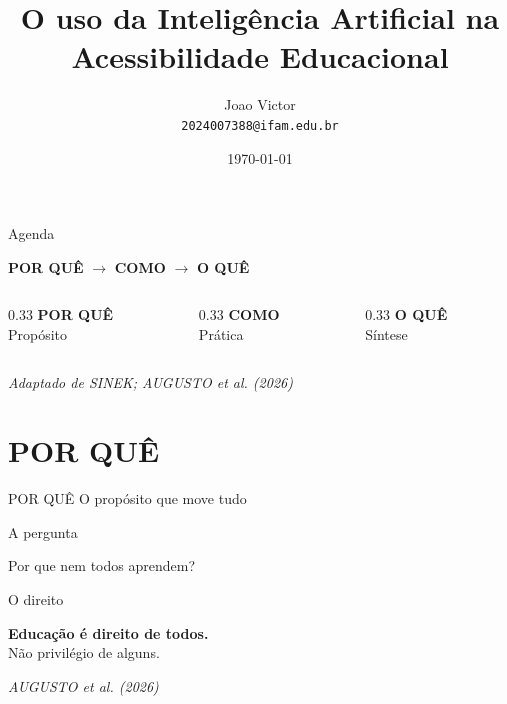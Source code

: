 \documentclass[11pt]{beamer}
\author[Joao Victor]{%
	Joao Victor\\[0.3em]
	\small\texttt{2024007388@ifam.edu.br}}
\title[IA na Acessibilidade Educacional]{O uso da Inteligência Artificial na Acessibilidade Educacional}
\institute[]{%
	Graduando em Licenciatura em Matemática\\}
\date{\today}
\newcommand{\citabnt}[1]{%
	\vfill
	\begin{flushright}
		\tiny\textit{#1}
	\end{flushright}
}
\begin{document}
	
	\begin{frame}
		\titlepage
	\end{frame}
	
	\begin{frame}{Agenda}
		\begin{center}
			\Large
			\textbf{POR QUÊ} $\rightarrow$ \textbf{COMO} $\rightarrow$ \textbf{O QUÊ}
		\end{center}
		\vspace{1.5em}
		\begin{columns}[T]
			\begin{column}{0.33\textwidth}
				\centering
				\textbf{\large POR QUÊ}\\[0.3em]
				\tiny Propósito
			\end{column}
			\begin{column}{0.33\textwidth}
				\centering
				\textbf{\large COMO}\\[0.3em]
				\tiny Prática
			\end{column}
			\begin{column}{0.33\textwidth}
				\centering
				\textbf{\large O QUÊ}\\[0.3em]
				\tiny Síntese
			\end{column}
		\end{columns}
		\citabnt{Adaptado de SINEK; AUGUSTO et al. (2026)}
	\end{frame}
	
	\section{POR QUÊ}
	
	\begin{frame}{}
		\begin{center}
			\Huge POR QUÊ
			\vspace{1em}
			\normalsize
			O propósito que move tudo
		\end{center}
	\end{frame}
	
	\begin{frame}{A pergunta}
		\begin{center}
			\Huge
			Por que nem todos aprendem?
		\end{center}
	\end{frame}
	
	\begin{frame}{O direito}
		\begin{center}
			\Large
			\textbf{Educação é direito de todos.}\\
			\vspace{0.5em}
			Não privilégio de alguns.
		\end{center}
		\citabnt{AUGUSTO et al. (2026)}
	\end{frame}
	
\end{document}
